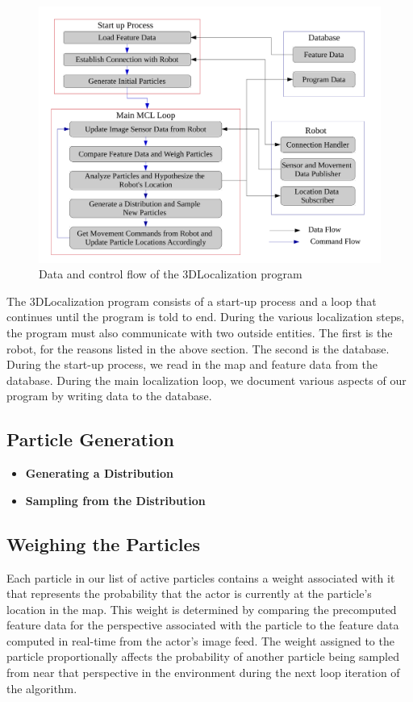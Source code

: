 \documentclass[a4paper,11pt]{article}
\begin{document}
  \begin{figure}[h!]
   \centering
     \includegraphics[width=\textwidth]{../Artifacts/FlowChart}
 \caption{Data and control flow of the 3DLocalization program}
 \label{fig:flowchart}
\end{figure}

The 3DLocalization program consists of a start-up process and a loop that continues until the program is told to end. During the various localization steps, the program must also communicate with two outside entities. The first is the robot, for the reasons listed in the above section. The second is the database. During the start-up process, we read in the map and feature data from the database. During the main localization loop, we document various aspects of our program by writing data to the database. 

\subsection{Particle Generation}
\begin{itemize}
  \item \textbf{Generating a Distribution}
  \item \textbf{Sampling from the Distribution}
\end{itemize}

\subsection{Weighing the Particles}
Each particle in our list of active particles contains a weight associated with it that represents the probability that the actor is currently at the particle's location in the map. This weight is determined by comparing the precomputed feature data for the perspective associated with the particle to the feature data computed in real-time from the actor's image feed. The weight assigned to the particle proportionally affects the probability of another particle being sampled from near that perspective in the environment during the next loop iteration of the algorithm.
\end{document}
